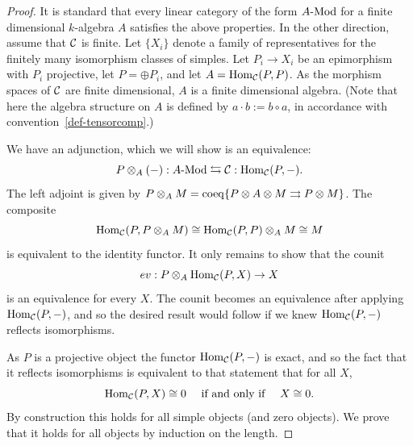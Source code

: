 \documentclass{amsart}
\begin{document}
\begin{proof}
	It is standard that every linear category of the form $\Mod{A}{}$ for a finite dimensional $k$-algebra $A$ satisfies the above properties. %
	In the other direction, assume that $\mathcal C$ is finite. Let $\{X_i\}$ denote a family of representatives for the finitely many isomorphism classes of simples. Let $P_i \to X_i$ be an epimorphism with $P_i$ projective, let $P = \oplus P_i$, and let $A = \operatorname{Hom}_{\mathcal C}(P,P)$. As the morphism spaces of $\mathcal C$ are finite dimensional, $A$ is a finite dimensional algebra.  (Note that here the algebra structure on $A$ is defined by $a \cdot b := b \circ a$, in accordance with convention~\ref{def-tensorcomp}.)
	
We have an adjunction, which we will show is an equivalence:
	\begin{equation*}
		P \otimes_A (-):\Mod{A}{} \leftrightarrows \cC: \Hom_{\cC}(P,-).
	\end{equation*}
	The left adjoint is given by $P \otimes_A M = \operatorname{coeq}\{ P \otimes A \otimes M \rightrightarrows P \otimes M\}$. 
The composite 
\begin{equation*}
	\operatorname{Hom}_{\mathcal C}(P, P \otimes_A M) \cong \operatorname{Hom}_{\mathcal C}(P, P) \otimes_A M \cong M
\end{equation*}
 is equivalent to the identity functor. It only remains to show that the counit 
\begin{equation*}
	ev:P \otimes_A \operatorname{Hom}_{\mathcal C}(P, X) \to X
\end{equation*}
is an equivalence for every $X$. The counit becomes an equivalence after applying $\operatorname{Hom}_{\mathcal C}(P,-)$, and so the desired result would follow if we knew $\operatorname{Hom}_{\mathcal C}(P,-)$ reflects isomorphisms. 

As $P$ is a projective object the functor $\operatorname{Hom}_{\mathcal C}(P,-)$ is exact, and so the fact that it reflects isomorphisms is equivalent to that statement that for all $X$, 
\begin{equation*}
	\operatorname{Hom}_{\mathcal C}(P,X) \cong 0 \quad \textrm{ if and only if } \quad X \cong 0.
\end{equation*} 
By construction this holds for all simple objects (and zero objects). We prove that it holds for all objects by induction on the length. 


\end{proof}
\end{document}
